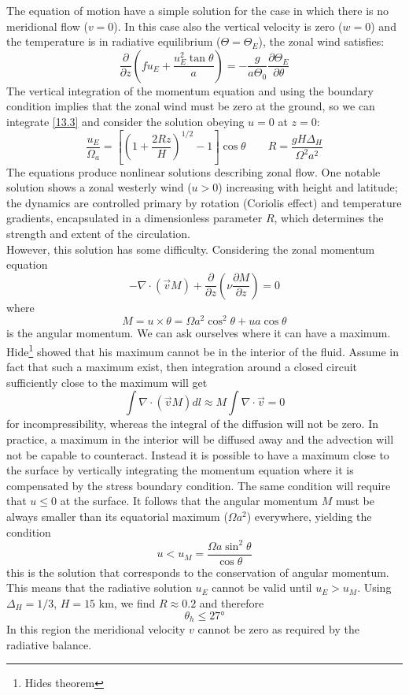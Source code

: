 The equation of motion have a simple solution for the case in which there is no meridional flow ($v=0$). In this case also the vertical velocity is zero ($w=0$) and the temperature is in radiative equilibrium ($\Theta=\Theta_E$), the zonal wind satisfies:
\begin{equation}\label{13.3}
	\frac{\partial}{\partial z}\left(fu_E+\frac{u_E^2\tan\theta}{a}\right)=-\frac{g}{a\Theta_0}\frac{\partial\Theta_E}{\partial\theta}
\end{equation}
The vertical integration of the momentum equation and using the boundary condition implies that the zonal wind must be zero at the ground, so we can integrate \ref{13.3} and consider the solution obeying $u=0$ at $z=0$:
\begin{equation}\label{13.5}
	\frac{u_E}{\Omega_a}=\left[\left(1+\frac{2Rz}{H}\right)^{1/2}-1\right]\cos\theta\qquad R=\frac{gH\Delta_H}{\Omega^2a^2}
\end{equation}
The equations produce nonlinear solutions describing zonal flow. One notable solution shows a zonal westerly wind ($u>0$) increasing with height and latitude; the dynamics are controlled primary by rotation (Coriolis effect) and temperature gradients, encapsulated in a dimensionless parameter $R$, which determines the strength and extent of the circulation.\\


However, this solution has some difficulty. Considering the zonal momentum equation
\begin{equation}
	-\nabla\cdot(\vec{v}M)+\frac{\partial}{\partial z}\left(\nu\frac{\partial M}{\partial z}\right)=0
\end{equation}
where
$$M=u\times\theta=\Omega a^2\cos^2\theta+ua\cos\theta$$ is the angular momentum. We can ask ourselves where it can have a maximum. Hide\footnote{Hides theorem} showed that his maximum cannot be in the interior of the fluid. Assume in fact that such a maximum exist, then integration around a closed circuit sufficiently close to the maximum will get
$$\int\nabla\cdot(\vec{v}M)dl\approx M\int\nabla\cdot\vec{v}=0$$
for incompressibility, whereas the integral of the diffusion will not be zero. In practice, a maximum in the interior will be diffused away and the advection will not be capable to counteract. Instead it is possible to have a maximum close to the surface by vertically integrating the momentum equation where it is compensated by the stress boundary condition. The same condition will require that $u\leq 0$ at the surface. It follows that the angular momentum $M$ must be always smaller than its equatorial maximum ($\Omega a^2$) everywhere, yielding the condition
\begin{equation}\label{eq.umax}
	u<u_M=\frac{\Omega a\sin^2\theta}{\cos\theta}
\end{equation}
this is the solution that corresponds to the conservation of angular momentum. This means that the radiative solution $u_E$ cannot be valid until $u_E>u_M$. Using $\Delta_H=1/3$, $H=15$ km, we find $R\approx 0.2$ and therefore
$$\theta_h\leq27\text{°}$$
In this region the meridional velocity $v$ cannot be zero as required by the radiative balance.



